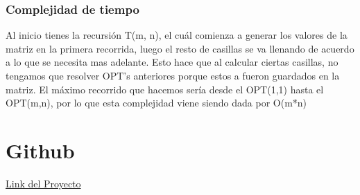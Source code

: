 \documentclass[12pt]{article}
\begin{document}
 
\subsubsection{Complejidad de tiempo}
Al inicio tienes la recursión T(m, n), el cuál comienza a generar los valores de la matriz en la primera recorrida, luego el resto de casillas se va llenando de acuerdo a lo que se necesita mas adelante. Esto hace que al calcular ciertas casillas, no tengamos que resolver OPT's anteriores porque estos a fueron guardados en la matriz. El máximo recorrido que hacemos sería desde el OPT(1,1) hasta el OPT(m,n), por lo que esta complejidad viene siendo dada por O(m*n)


\section{Github}
\href{https://github.com/LuchoPonceC/ADA-project}{Link del Proyecto}
\end{document}

